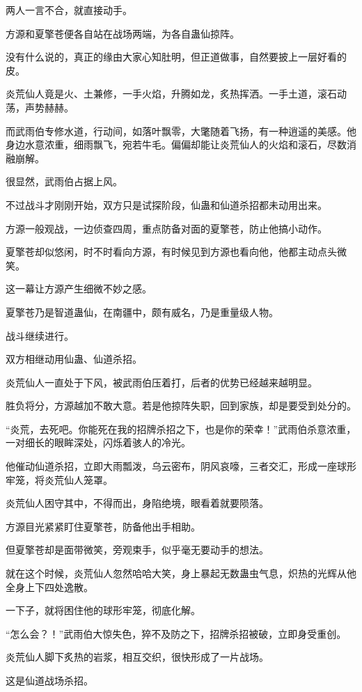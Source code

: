 \begin{this_body}
两人一言不合，就直接动手。

方源和夏擎苍便各自站在战场两端，为各自蛊仙掠阵。

没有什么说的，真正的缘由大家心知肚明，但正道做事，自然要披上一层好看的皮。

炎荒仙人竟是火、土兼修，一手火焰，升腾如龙，炙热挥洒。一手土道，滚石动荡，声势赫赫。

而武雨伯专修水道，行动间，如落叶飘零，大氅随着飞扬，有一种逍遥的美感。他身边水意浓重，细雨飘飞，宛若牛毛。偏偏却能让炎荒仙人的火焰和滚石，尽数消融崩解。

很显然，武雨伯占据上风。

不过战斗才刚刚开始，双方只是试探阶段，仙蛊和仙道杀招都未动用出来。

方源一般观战，一边侦查四周，重点防备对面的夏擎苍，防止他搞小动作。

夏擎苍却似悠闲，时不时看向方源，有时候见到方源也看向他，他都主动点头微笑。

这一幕让方源产生细微不妙之感。

夏擎苍乃是智道蛊仙，在南疆中，颇有威名，乃是重量级人物。

战斗继续进行。

双方相继动用仙蛊、仙道杀招。

炎荒仙人一直处于下风，被武雨伯压着打，后者的优势已经越来越明显。

胜负将分，方源越加不敢大意。若是他掠阵失职，回到家族，却是要受到处分的。

“炎荒，去死吧。你能死在我的招牌杀招之下，也是你的荣幸！”武雨伯杀意浓重，一对细长的眼眸深处，闪烁着骇人的冷光。

他催动仙道杀招，立即大雨瓢泼，乌云密布，阴风哀嚎，三者交汇，形成一座球形牢笼，将炎荒仙人笼罩。

炎荒仙人困守其中，不得而出，身陷绝境，眼看着就要陨落。

方源目光紧紧盯住夏擎苍，防备他出手相助。

但夏擎苍却是面带微笑，旁观束手，似乎毫无要动手的想法。

就在这个时候，炎荒仙人忽然哈哈大笑，身上暴起无数蛊虫气息，炽热的光辉从他全身上下四处逸散。

一下子，就将困住他的球形牢笼，彻底化解。

“怎么会？！”武雨伯大惊失色，猝不及防之下，招牌杀招被破，立即身受重创。

炎荒仙人脚下炙热的岩浆，相互交织，很快形成了一片战场。

这是仙道战场杀招。


\end{this_body}
